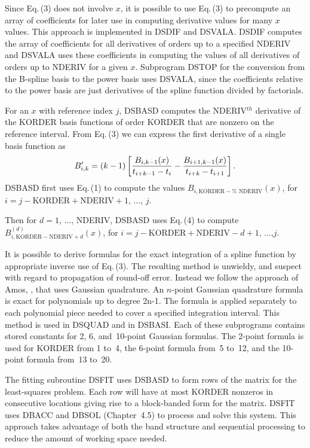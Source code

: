 \documentclass[twoside]{MATH77}
\begin{document}
Since Eq.\,(3) does not involve $x$, it is possible to use Eq.\,(3) to precompute
an array of coefficients for later use in computing derivative values for
many $x$ values. This approach is implemented in DSDIF and DSVALA. DSDIF
computes the array of coefficients for all derivatives of orders up to a
specified NDERIV and DSVALA uses these coefficients in computing the values
of all derivatives of orders up to NDERIV for a given $x$. Subprogram DSTOP
for the conversion from the B-spline basis to the power basis uses DSVALA,
since the coefficients relative to the power basis are just derivatives of
the spline function divided by factorials.

For an $x$ with reference index $j$, DSBASD computes the NDERIV$^{th}$
derivative of the KORDER basis functions of order KORDER that are nonzero on
the reference interval. From Eq.\,(3) we can express the first derivative of a
single basis function as
\begin{equation}
\label{O4}B_{i,k}^{\prime }=\left( k-1\right) \left[ \frac{B_{i,k-1}(x)}{%
t_{i+k-1}-t_i}-\frac{B_{i+1,k-1}(x)}{t_{i+k}-t_{i+1}}\right] .
\end{equation}
DSBASD first uses Eq.\,(1) to compute the values $B_{i,\text{KORDER}-\text{%
NDERIV}}(x)$, for $i=j- \text{KORDER} + \text{NDERIV}+1$, ..., $j$.
\rule{0pt}{10pt} Then for $d=1$, ..., NDERIV, DSBASD uses Eq.\,(4) to
compute $B_{i,\text{KORDER}-\text{NDERIV}+d}^{(d)}(x)$,
for $i = j - \text{KORDER} + \text{NDERIV}-d+1$, ...,$j.$\rule{0pt}{10pt}

It is possible to derive formulas for the exact integration of a spline
function by appropriate inverse use of Eq.\,(3).  The resulting method is
unwieldy, and suspect with regard to propagation of round-off error.
Instead we follow the approach of Amos, \cite{Amos:1979:xxx}, that uses
Gaussian quadrature.  An $n$-point Gaussian quadrature formula is exact
for polynomials up to degree 2n-1.  The formula is applied separately to
each polynomial piece needed to cover a specified integration interval.
This method is used in DSQUAD and in DSBASI.  Each of these subprograms
contains stored constants for 2, 6, and~10-point Gaussian formulas.  The
2-point formula is used for KORDER from 1 to~4, the 6-point formula from~5
to~12, and the 10-point formula from~13 to~20.

The fitting subroutine DSFIT uses DSBASD to form rows of the matrix for the
least-squares problem. Each row will have at most KORDER nonzeros in
consecutive locations giving rise to a block-banded form for the matrix.
DSFIT uses DBACC and DBSOL (Chapter~4.5) to process and solve this system.
This approach takes advantage of both the band structure and sequential
processing to reduce the amount of working space needed.
\end{document}
